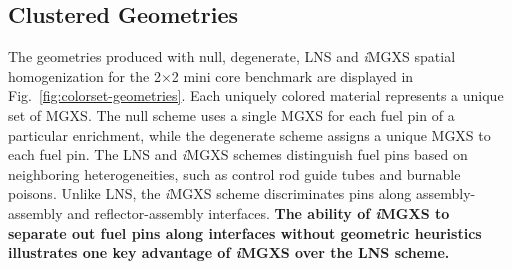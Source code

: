 \documentclass[12pt,twoside]{mitthesis-exec}
\begin{document}
\subsection*{Clustered Geometries}

The geometries produced with null, degenerate, LNS and \textit{i}MGXS spatial homogenization for the 2$\times$2 mini core benchmark are displayed in Fig.~\ref{fig:colorset-geometries}. Each uniquely colored material represents a unique set of MGXS. The null scheme uses a single MGXS for each fuel pin of a particular enrichment, while the degenerate scheme assigns a unique MGXS to each fuel pin. The LNS and \textit{i}MGXS schemes distinguish fuel pins based on neighboring heterogeneities, such as control rod guide tubes and burnable poisons. Unlike LNS, the \textit{i}MGXS scheme discriminates pins along assembly-assembly and reflector-assembly interfaces. \textbf{The ability of \textit{i}MGXS to separate out fuel pins along interfaces without geometric heuristics illustrates one key advantage of \textit{i}MGXS over the LNS scheme.}

\end{document}
